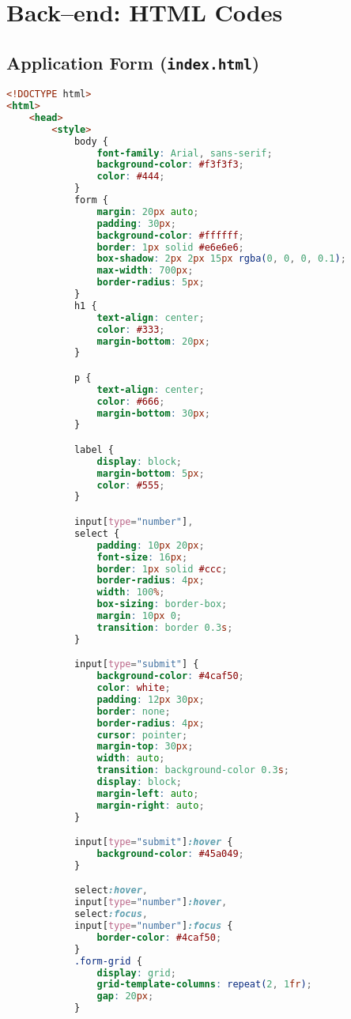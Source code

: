 \section{Back--end: HTML Codes}
\subsection{Application Form (\lstinline{index.html})}
\begin{lstlisting}[language=HTML, basicstyle=\footnotesize\ttfamily]
<!DOCTYPE html>
<html>
	<head>
		<style>
			body {
				font-family: Arial, sans-serif;
				background-color: #f3f3f3;
				color: #444;
			}
			form {
				margin: 20px auto;
				padding: 30px;
				background-color: #ffffff;
				border: 1px solid #e6e6e6;
				box-shadow: 2px 2px 15px rgba(0, 0, 0, 0.1);
				max-width: 700px;
				border-radius: 5px;
			}
			h1 {
				text-align: center;
				color: #333;
				margin-bottom: 20px;
			}

			p {
				text-align: center;
				color: #666;
				margin-bottom: 30px;
			}

			label {
				display: block;
				margin-bottom: 5px;
				color: #555;
			}

			input[type="number"],
			select {
				padding: 10px 20px;
				font-size: 16px;
				border: 1px solid #ccc;
				border-radius: 4px;
				width: 100%;
				box-sizing: border-box;
				margin: 10px 0;
				transition: border 0.3s;
			}

			input[type="submit"] {
				background-color: #4caf50;
				color: white;
				padding: 12px 30px;
				border: none;
				border-radius: 4px;
				cursor: pointer;
				margin-top: 30px;
				width: auto;
				transition: background-color 0.3s;
				display: block;
				margin-left: auto;
				margin-right: auto;
			}

			input[type="submit"]:hover {
				background-color: #45a049;
			}

			select:hover,
			input[type="number"]:hover,
			select:focus,
			input[type="number"]:focus {
				border-color: #4caf50;
			}
			.form-grid {
				display: grid;
				grid-template-columns: repeat(2, 1fr);
				gap: 20px;
			}


\end{lstlisting}
